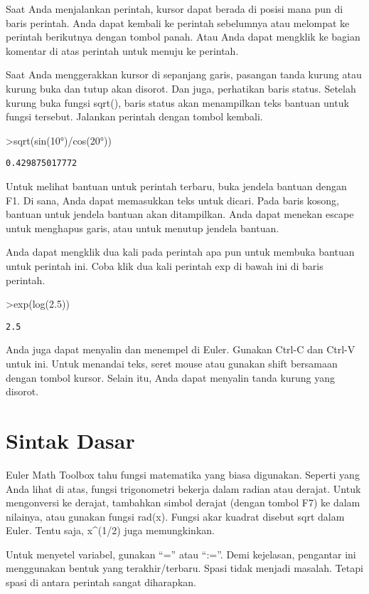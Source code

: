 \documentclass[
]{book}
\begin{document}
Saat Anda menjalankan perintah, kursor dapat berada di posisi mana pun di baris perintah. Anda dapat kembali ke perintah sebelumnya atau melompat ke perintah berikutnya dengan tombol panah. Atau Anda dapat mengklik ke bagian komentar di atas perintah untuk menuju ke perintah.

Saat Anda menggerakkan kursor di sepanjang garis, pasangan tanda kurung atau kurung buka dan tutup akan disorot. Dan juga, perhatikan baris status. Setelah kurung buka fungsi sqrt(), baris status akan menampilkan teks bantuan untuk fungsi tersebut. Jalankan perintah dengan tombol kembali.

\textgreater sqrt(sin(10°)/cos(20°))

\begin{verbatim}
0.429875017772
\end{verbatim}

Untuk melihat bantuan untuk perintah terbaru, buka jendela bantuan dengan F1. Di sana, Anda dapat memasukkan teks untuk dicari. Pada baris kosong, bantuan untuk jendela bantuan akan ditampilkan. Anda dapat menekan escape untuk menghapus garis, atau untuk menutup jendela bantuan.

Anda dapat mengklik dua kali pada perintah apa pun untuk membuka bantuan untuk perintah ini. Coba klik dua kali perintah exp di bawah ini di baris perintah.

\textgreater exp(log(2.5))

\begin{verbatim}
2.5
\end{verbatim}

Anda juga dapat menyalin dan menempel di Euler. Gunakan Ctrl-C dan Ctrl-V untuk ini. Untuk menandai teks, seret mouse atau gunakan shift bersamaan dengan tombol kursor. Selain itu, Anda dapat menyalin tanda kurung yang disorot.

\chapter{Sintak Dasar}\label{sintak-dasar}

Euler Math Toolbox tahu fungsi matematika yang biasa digunakan. Seperti yang Anda lihat di atas, fungsi trigonometri bekerja dalam radian atau derajat. Untuk mengonversi ke derajat, tambahkan simbol derajat (dengan tombol F7) ke dalam nilainya, atau gunakan fungsi rad(x). Fungsi akar kuadrat disebut sqrt dalam Euler. Tentu saja, x\^{}(1/2) juga memungkinkan.

Untuk menyetel variabel, gunakan ``='' atau ``:=''. Demi kejelasan, pengantar ini menggunakan bentuk yang terakhir/terbaru. Spasi tidak menjadi masalah. Tetapi spasi di antara perintah sangat diharapkan.
\end{document}
